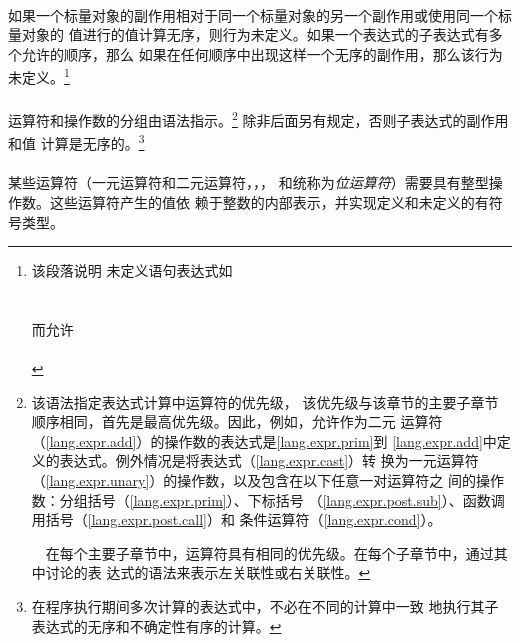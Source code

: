 {\paragraph{}
如果一个标量对象的副作用相对于同一个标量对象的另一个副作用或使用同一个标量对象的
值进行的值计算无序，则行为未定义。如果一个表达式的子表达式有多个允许的顺序，那么
如果在任何顺序中出现这样一个无序的副作用，那么该行为未定义。\footnote{该段落说明
未定义语句表达式如                                                            \\
\mbox{\hspace{4em}}                                          \\
\mbox{\hspace{4em}}                                           \\
而允许                                                                        \\
\mbox{\hspace{4em}}                                            \\
\mbox{\hspace{4em}}}

\paragraph{}
运算符和操作数的分组由语法指示。\footnote{该语法指定表达式计算中运算符的优先级，
该优先级与该章节的主要子章节顺序相同，首先是最高优先级。因此，例如，允许作为二元
\tm{+}运算符（\ref{lang.expr.add}）的操作数的表达式是\ref{lang.expr.prim}到
\ref{lang.expr.add}中定义的表达式。例外情况是将表达式（\ref{lang.expr.cast}）转
换为一元运算符（\ref{lang.expr.unary}）的操作数，以及包含在以下任意一对运算符之
间的操作数：分组括号\tm{()}（\ref{lang.expr.prim}）、下标括号\tm{[]}
（\ref{lang.expr.post.sub}）、函数调用括号\tm{()}（\ref{lang.expr.post.call}）和
条件运算符（\ref{lang.expr.cond}）。\vspace{0.2cm}

\ \ 在每个主要子章节中，运算符具有相同的优先级。在每个子章节中，通过其中讨论的表
达式的语法来表示左关联性或右关联性。} 除非后面另有规定，否则子表达式的副作用和值
计算是无序的。\footnote{在程序执行期间多次计算的表达式中，不必在不同的计算中一致
地执行其子表达式的无序和不确定性有序的计算。}

\paragraph{}
某些运算符（一元运算符\tm{\~}和二元运算符\tm{\tl{}\tl}，\tm{\tg{}\tg}，\tm{\&}，
\tm{\^}和\tm{|}统称为\textit{位运算符}）需要具有整型操作数。这些运算符产生的值依
赖于整数的内部表示，并实现定义和未定义的有符号类型。

}
